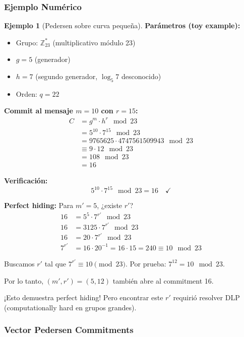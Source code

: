\documentclass[11pt,a4paper,twoside,openright]{book}
\theoremstyle{definition}
\newtheorem{example}{Ejemplo}[chapter]
\theoremstyle{plain}
\theoremstyle{remark}
\begin{document}
\subsubsection{Ejemplo Numérico}

\begin{example}[Pedersen sobre curva pequeña]
\textbf{Parámetros (toy example):}
\begin{itemize}
    \item Grupo: $\mathbb{Z}_{23}^*$ (multiplicativo módulo 23)
    \item $g = 5$ (generador)
    \item $h = 7$ (segundo generador, $\log_5 7$ desconocido)
    \item Orden: $q = 22$
\end{itemize}

\textbf{Commit al mensaje $m = 10$ con $r = 15$:}
\begin{align}
C &= g^m \cdot h^r \mod 23 \\
  &= 5^{10} \cdot 7^{15} \mod 23 \\
  &= 9765625 \cdot 4747561509943 \mod 23 \\
  &\equiv 9 \cdot 12 \mod 23 \\
  &= 108 \mod 23 \\
  &= 16
\end{align}

\textbf{Verificación:}
\[ 5^{10} \cdot 7^{15} \mod 23 = 16 \quad \checkmark \]

\textbf{Perfect hiding:} Para $m' = 5$, ¿existe $r'$?
\begin{align}
16 &= 5^5 \cdot 7^{r'} \mod 23 \\
16 &= 3125 \cdot 7^{r'} \mod 23 \\
16 &= 20 \cdot 7^{r'} \mod 23 \\
7^{r'} &= 16 \cdot 20^{-1} = 16 \cdot 15 = 240 \equiv 10 \mod 23
\end{align}

Buscamos $r'$ tal que $7^{r'} \equiv 10 \pmod{23}$. Por prueba: $7^{12} = 10 \mod 23$.

Por lo tanto, $(m', r') = (5, 12)$ también abre al commitment 16.

¡Esto demuestra perfect hiding! Pero encontrar este $r'$ requirió resolver DLP (computationally hard en grupos grandes).
\end{example}

\subsubsection{Vector Pedersen Commitments}
\end{document}
